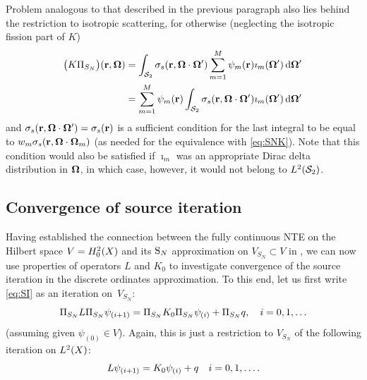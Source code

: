 Problem analogous to that described in the previous paragraph also lies behind the restriction to isotropic scattering,
for otherwise (neglecting the isotropic fission part of $K$) 
$$
	\begin{aligned}
		\bigl(K\Projop[S_N]\bigr)(\br,\bomega) &= \intA[']{\sigma_s(\br,\bomega\cdot\bomega')\sum_{m=1}^M
		\psi_m(\br)\imath_m(\bomega')}\\
		&= \sum_{m=1}^M \psi_m(\br)\intA[']{\sigma_s(\br,\bomega\cdot\bomega')\imath_m(\bomega')}
	\end{aligned}
$$
and $\sigma_s(\br,\bomega\cdot\bomega') = \sigma_s(\br)$ is a sufficient condition for the last integral to be equal to
$w_m \sigma_s(\br,\bomega\cdot\bomega_m)$ (as needed for the equivalence with \eqref{eq:SNK}). Note that this condition
would also be satisfied if $\imath_m$ was an appropriate Dirac delta distribution in $\bomega$, in which
case, however, it would not belong to $\Lp[2](\Sphere)$.
 
\subsection{Convergence of source iteration} \label{sec:SI}
Having established the connection between the fully continuous NTE on the Hilbert space $V = \Hpnot[2](X)$ and its $\SN$
approximation on $V_{S_N} \subset V$ in , we can now use properties of operators $L$ and $K_0$ to
investigate convergence of the source iteration in the discrete ordinates approximation. To this end, let us first write
\eqref{eq:SI} as an iteration on~$V_{S_N}$:
\begin{equation}\label{eq:SISN}
	\Projop[S_N] \op{L} \Projop[S_N] \psi_{(i+1)} = \Projop[S_N] \op{K}_0 \Projop[S_N] \psi_{(i)} +  \Projop[S_N] q,\quad
	i = 0,1,\ldots 
\end{equation}
(assuming given $\psi_{(0)} \in V$).
Again, this is just a restriction to $V_{S_N}$ of the following iteration on $\Lp[2](X)$:
\begin{equation}\label{eq:SIhilbert}
	\op{L} \psi_{(i+1)} = \op{K}_0 \psi_{(i)} + q  \quad i = 0,1,\ldots.
\end{equation}

